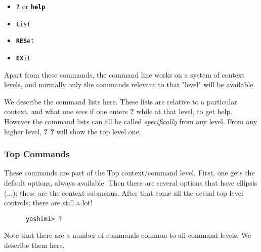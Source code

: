    \begin{itemize}
      \item \texttt{\textbf{?}} or \texttt{\textbf{help}}
      \item \texttt{\textbf{L}ist}
      \item \texttt{\textbf{RES}et}
      \item \texttt{\textbf{EX}it}
   \end{itemize}

   Apart from these commands, the command line works on a system of
   context levels, and normally only the commands relevant to that "level"
   will be available.

   We describe the command lists here. These lists are relative to
   a particular context, and what one sees if one enters
   \textbf{?} while at that level, to get help.
   However the command lists can all be called \textsl{specifically} from any
   level. From any higher level, \textbf{? ?} will show the top level one.

\subsubsection{Top Commands}
\label{subsec:command_line_top_command_list}

   These commands are part of the Top context/command level.
   First, one gets the default options, always available.
   Then there are several options that have ellipsis (...);
   these are the context submenus.
   After that come all the actual top level controls; there are still a lot!

   \begin{verbatim}
      yoshimi> ?
   \end{verbatim}

   Note that there are a number of commands common to all command levels.
   We describe them here.

